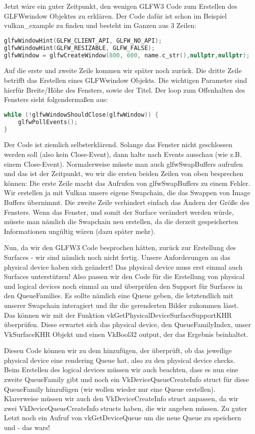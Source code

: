 \documentclass[11pt,a4paper]{report}
\begin{document}
Jetzt wäre ein guter Zeitpunkt, den wenigen GLFW3 Code zum Erstellen des GLFWwindow Objektes zu erklären. Der Code dafür ist schon im Beispiel vulkan\_example zu finden und besteht im Ganzen aus 3 Zeilen:
\begin{lstlisting}[language=C++]
glfwWindowHint(GLFW_CLIENT_API, GLFW_NO_API);
glfwWindowHint(GLFW_RESIZABLE, GLFW_FALSE);
glfwWindow = glfwCreateWindow(800, 600, name.c_str(),nullptr,nullptr);
\end{lstlisting}
Auf die erste und zweite Zeile kommen wir später noch zurück. Die dritte Zeile betrifft das Erstellen eines GLFWwindow Objekts. Die wichtigen Parameter sind hierfür Breite/Höhe des Fensters, sowie der Titel. Der loop zum Offenhalten des Fensters sieht folgendermaßen aus:
\begin{lstlisting}[language=C++]
while (!glfwWindowShouldClose(glfwWindow)) {
	glfwPollEvents();
}
\end{lstlisting}
Der Code ist ziemlich selbsterklärend. Solange das Fenster nicht geschlossen werden soll (also kein Close-Event), dann halte nach Events ausschau (wie z.B. einem Close-Event). Normalerweise müsste man auch glfwSwapBuffers aufrufen und das ist der Zeitpunkt, wo wir die ersten beiden Zeilen von oben besprechen können: Die erste Zeile macht das Aufrufen von glfwSwapBuffers zu einem Fehler. Wir erstellen ja mit Vulkan unsere eigene Swapchain, die das Swappen von Image Buffers übernimmt. Die zweite Zeile verhindert einfach das Ändern der Größe des Fensters. Wenn das Fenster, und somit der Surface verändert werden würde, müsste man nämlich die Swapchain neu erstellen, da die derzeit gespeicherten Informationen ungültig wären (dazu später mehr).

Nun, da wir den GLFW3 Code besprochen hätten, zurück zur Erstellung des Surfaces - wir sind nämlich noch nicht fertig. Unsere Anforderungen an das physical device haben sich geändert! Das physical device muss erst einmal auch Surfaces unterstützen! Also passen wir den Code für die Erstellung von physical und logical devices noch einmal an und überprüfen den Support für Surfaces in den QueueFamilies. Es sollte nämlich eine Queue geben, die letztendlich mit unserer Swapchain interagiert und ihr die gerenderten Bilder zukommen lässt. Das können wir mit der Funktion vkGetPhysicalDeviceSurfaceSupportKHR überprüfen. Diese erwartet sich das physical device, den QueueFamilyIndex, unser VkSurfaceKHR Objekt und einen VkBool32 output, der das Ergebnis beinhaltet.

Diesen Code können wir zu dem hinzufügen, der überprüft, ob das jeweilige physical device eine rendering Queue hat, also zu den physical device checks. Beim Erstellen des logical devices müssen wir auch beachten, dass es nun eine zweite QueueFamily gibt und noch ein VkDeviceQueueCreateInfo struct für diese QueueFamily hinzufügen (wir wollen wieder nur eine Queue erstellen). Klarerweise müssen wir auch den VkDeviceCreateInfo struct anpassen, da wir zwei VkDeviceQueueCreateInfo structs haben, die wir angeben müssen. Zu guter Letzt noch ein Aufruf von vkGetDeviceQueue um die neue Queue zu speichern und - das wars!
\end{document}

